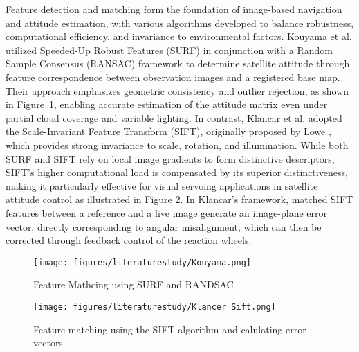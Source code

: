 
\noindent
Feature detection and matching form the foundation of image-based navigation and attitude estimation, with various algorithms developed to balance robustness, computational efficiency, and invariance to environmental factors. Kouyama et al. \cite{Kouyama2017} utilized Speeded-Up Robust Features (SURF) in conjunction with a Random Sample Consensus (RANSAC) framework to determine satellite attitude through feature correspondence between observation images and a registered base map. Their approach emphasizes geometric consistency and outlier rejection, as shown in Figure~\ref{fig:Kouyama}, enabling accurate estimation of the attitude matrix even under partial cloud coverage and variable lighting. In contrast, Klancar et al. \cite{Klancar2013} adopted the Scale-Invariant Feature Transform (SIFT), originally proposed by Lowe \cite{Lowe2004}, which provides strong invariance to scale, rotation, and illumination. While both SURF and SIFT rely on local image gradients to form distinctive descriptors, SIFT's higher computational load is compensated by its superior distinctiveness, making it particularly effective for visual servoing applications in satellite attitude control as illustrated in Figure \ref{fig:Klancer}. In Klancar's framework, matched SIFT features between a reference and a live image generate an image-plane error vector, directly corresponding to angular misalignment, which can then be corrected through feedback control of the reaction wheels.
\vspace{0.5cm}  

\begin{figure}[H]
    \centering
    \texttt{[image: figures/literaturestudy/Kouyama.png]}
    \caption{Feature Mathcing using SURF and RANDSAC \cite{Kouyama2017}}
    \label{fig:Kouyama}
\end{figure}

\begin{figure}[H]
    \centering
    \texttt{[image: figures/literaturestudy/Klancer Sift.png]}
    \caption{Feature matching using the SIFT algorithm and calulating error vectors \cite{Klancar2013} }
    \label{fig:Klancer}
\end{figure}

